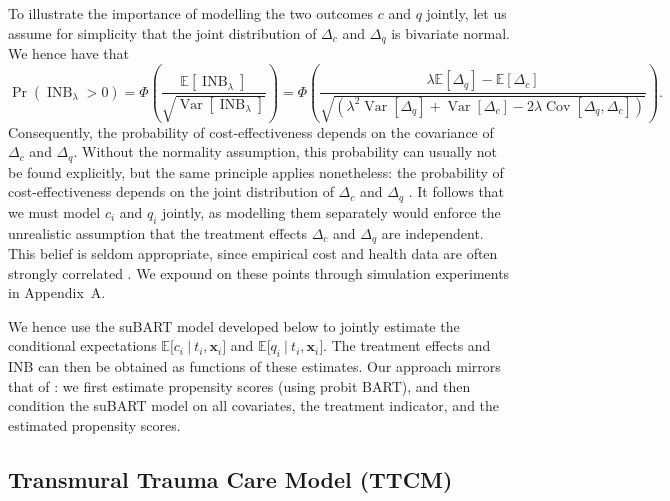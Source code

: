 \documentclass[aoas,preprint]{imsart}
\newcommand\given[1][]{\:#1\vert\:}
\theoremstyle{plain}
\theoremstyle{definition}
\theoremstyle{remark}
\begin{document}
To illustrate the importance of modelling the two outcomes $c$ and $q$ jointly, let us assume for simplicity that the joint distribution of $\Delta_c$ and $\Delta_q$ is bivariate normal. We hence have that
\[
\Pr\left(\operatorname{INB}_{\lambda} > 0\right) = \Phi\!\left(\!\frac{\mathbb{E}\!\left\lbrack \operatorname{INB}_{\lambda} \right\rbrack}{\sqrt{\operatorname{Var}\!\left\lbrack \operatorname{INB}_{\lambda} \right\rbrack}}\!\right) = \Phi\!\left(\!\frac{\lambda \mathbb{E}\!\left\lbrack \Delta_q \right\rbrack - \mathbb{E}\!\left\lbrack \Delta_c \right\rbrack}{\sqrt{\left(\lambda^2 \operatorname{Var}\!\left\lbrack \Delta_q \right\rbrack + \operatorname{Var}\!\left\lbrack \Delta_c \right\rbrack - 2 \lambda \operatorname{Cov}\!\left\lbrack \Delta_q, \Delta_c \right\rbrack \right)}}\!\right).
\]
Consequently, the probability of cost-effectiveness depends on the covariance of $\Delta_c$ and $\Delta_q$. Without the normality assumption, this probability can usually not be found explicitly, but the same principle applies nonetheless: the probability of cost-effectiveness depends on the joint distribution of $\Delta_c$ and $\Delta_q$ \citep{lothgren2000definition, gabrio2019bayesian}. It follows that we must model $c_i$ and $q_i$ jointly, as modelling them separately would enforce the unrealistic assumption that the treatment effects $\Delta_c$ and $\Delta_q$ are independent. This belief is seldom appropriate, since empirical cost and health data are often strongly correlated \citep{willan2004regression}. We expound on these points through simulation experiments in Appendix~A.

We hence use the suBART model developed below to jointly estimate the conditional expectations $\mathbb{E}\lbrack c_i\given t_i, \mathbf{x}_i\rbrack$ and $\mathbb{E}\lbrack q_i\given t_i, \mathbf{x}_i\rbrack$. The treatment effects and INB can then be obtained as functions of these estimates. Our approach mirrors that of \citet{hahn2020bayesian}: we first estimate propensity scores (using probit BART), and then condition the suBART model on all covariates, the treatment indicator, and the estimated propensity scores.

\subsection{Transmural Trauma Care Model (TTCM)}\label{sec:TTCM_intro}
\end{document}
